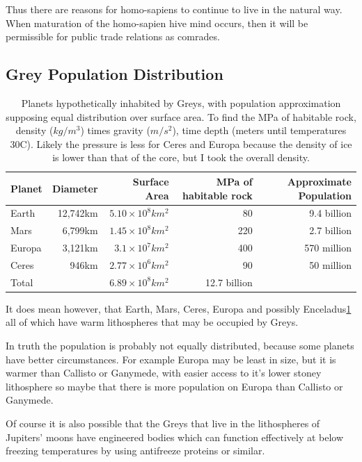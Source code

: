 \documentclass{report}
\begin{document}
Thus there are reasons for homo-sapiens to continue to live in the natural way.
When maturation of the homo-sapien hive mind occurs, then it will be
permissible for public trade relations as comrades.

\subsection{Grey Population Distribution}\label{popdist}
\begin{table}
\begin{tabular}{lrrrr}
  Planet & Diameter & Surface Area & MPa of habitable rock & Approximate Population\\
\midrule
  Earth & 12,742km & $5.10\times10^8km^2$& 80 & 9.4 billion\\
  Mars & 6,799km & $1.45\times10^8km^2$& 220 & 2.7 billion \\
  Europa & 3,121km & $3.1\times10^7km^2$& 400 & 570 million\\
  Ceres & 946km & $2.77\times10^6km^2$ & 90 & 50 million \\
\midrule
  Total &   & $6.89\times10^8km^2$ & 12.7 billion\\
\end{tabular}
\caption{Planets hypothetically inhabited by Greys, with population 
  approximation supposing equal distribution over surface area.
  To find the MPa of habitable rock, density ($kg/m^3$) times gravity ($m/s^2$),
  time depth (meters until temperatures 30C).
  Likely the pressure is less for Ceres and Europa because the density of ice is lower
  than that of the core, but I took the overall density.}\label{table:planets}
\end{table}

It does mean however, that Earth, Mars, Ceres, Europa and 
possibly Enceladus\ref{table:planets} all of which
have warm lithospheres that may be occupied by Greys. 

In truth the population is probably not equally distributed, because some
planets have better circumstances. For example Europa may be least in size, but
it is warmer than Callisto or Ganymede, with easier access to it's lower stoney
lithosphere so maybe that there is more population on Europa than Callisto or
Ganymede. 

Of course it is also possible that the Greys that live in the lithospheres of
Jupiters' moons have engineered bodies which can function effectively at below
freezing temperatures by using antifreeze proteins or similar. 
\end{document}
